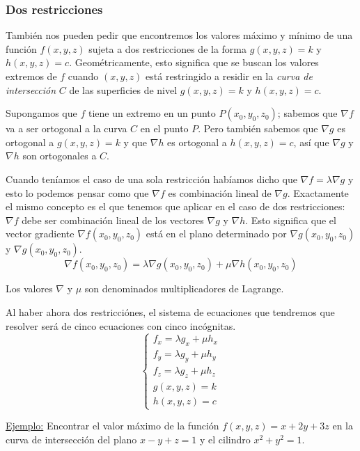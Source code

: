 \documentclass[12pt]{article}
\begin{document}
\subsubsection{Dos restricciones}
También nos pueden pedir que encontremos los valores máximo y mínimo de una función $ f(x,y,z) $ sujeta a dos restricciones de la forma $ g(x,y,z)=k $ y $ h(x,y,z)=c $. Geométricamente, esto significa que se buscan los valores extremos de $ f $ cuando $ (x,y,z) $ está restringido a residir en la \textit{curva de intersección} $ C $ de las superficies de nivel $ g(x,y,z)=k $ y $ h(x,y,z)=c $.

Supongamos que $ f $ tiene un extremo en un punto $ P(x_{0},y_{0},z_{0}) $; sabemos que $ \nabla f $ va a ser ortogonal a la curva $ C $ en el punto $ P $. Pero también sabemos que $ \nabla g $ es ortogonal a $ g(x,y,z)=k $ y que $ \nabla h $ es ortogonal a $ h(x,y,z)=c $, así que $ \nabla g $ y $ \nabla h $ son ortogonales a $ C $. 

Cuando teníamos el caso de una sola restricción habíamos dicho que $ \nabla f=\lambda \nabla g $ y esto lo podemos pensar como que $ \nabla f $ es combinación lineal de $ \nabla g $. Exactamente el mismo concepto es el que tenemos que aplicar en el caso de dos restricciones: $ \nabla f $ debe ser combinación lineal de los vectores $ \nabla g $ y $ \nabla h $. Esto significa que el vector gradiente $ \nabla f(x_{0},y_{0},z_{0}) $ está en el plano determinado por $ \nabla g(x_{0},y_{0},z_{0}) $ y $  \nabla g(x_{0},y_{0},z_{0})  $.
\[
	\boxed{\nabla f(x_{0},y_{0},z_{0})=\lambda \nabla g(x_{0},y_{0},z_{0}) + \mu \nabla h(x_{0},y_{0},z_{0})} 
\]

Los valores $ \nabla $ y $ \mu $ son denominados multiplicadores de Lagrange.

Al haber ahora dos restricciónes, el sistema de ecuaciones que tendremos que resolver será de cinco ecuaciones con cinco incógnitas.
\[
  \left\{
  \begin{aligned}
    f_{x}=\lambda g_{x} + \mu h_{x} \\
    f_{y}=\lambda g_{y} + \mu h_{y} \\
    f_{z}=\lambda g_{z} + \mu h_{z} \\
    g(x,y,z)=k \\
    h(x,y,z)=c
  \end{aligned}
  \right.
\]

\underline{Ejemplo:} Encontrar el valor máximo de la función $ f(x,y,z)=x+2y+3z $ en la curva de intersección del plano $ x-y+z=1 $ y el cilindro $ x^2+y^2=1 $.
\end{document}
